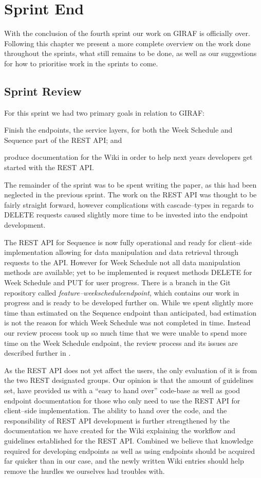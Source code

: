\chapter{Sprint End}
With the conclusion of the fourth sprint our work on GIRAF is officially over.
Following this chapter we present a more complete overview on the work done throughout the sprints, what still remains to be done, as well as our suggestions for how to prioritise work in the sprints to come.

\section{Sprint Review}
For this sprint we had two primary goals in relation to GIRAF:
\begin{enumberate*}
\item Finish the endpoints, the service layers, for both the Week Schedule and Sequence part of the REST API; and
\item produce documentation for the Wiki in order to help next years developers get started with the REST API.
\end{enumberate*}
The remainder of the sprint was to be spent writing the paper, as this had been neglected in the previous sprint.
The work on the REST API was thought to be fairly straight forward, however complications with cascade--types in regards to DELETE requests caused slightly more time to be invested into the endpoint development.

The REST API for Sequence is now fully operational and ready for client--side implementation allowing for data manipulation and data retrieval through requests to the API.
However for  Week Schedule not all data manipulation methods are available; yet to be implemented is request methods DELETE for Week Schedule and PUT for user progress.
There is a branch in the Git repository called \textit{feature--weekscheduleendpoint}, which contains our work in progress and is ready to be developed further on.
While we spent slightly more time than estimated on the Sequence endpoint than anticipated, bad estimation is not the reason for which Week Schedule was not completed in time.
Instead our review process took up so much time that we were unable to spend more time on the Week Schedule endpoint, the review process and its issues are described further in .

As the REST API does not yet affect the users, the only evaluation of it is from the two REST designated groups.
Our opinion is that the amount of guidelines set, have provided us with a \enquote{easy to hand over} code-base as well as good endpoint documentation for those who only need to use the REST API for client--side implementation.
The ability to hand over the code, and the responsibility of REST API development is further strengthened by the documentation we have created for the Wiki explaining the workflow and guidelines established for the REST API.
Combined we believe that knowledge required for developing endpoints as well as using endpoints should be acquired far quicker than in our case, and the newly written Wiki entries should help remove the hurdles we ourselves had troubles with.

